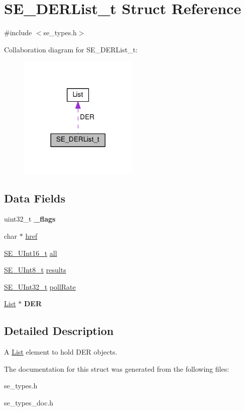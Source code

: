 \hypertarget{structSE__DERList__t}{}\section{S\+E\+\_\+\+D\+E\+R\+List\+\_\+t Struct Reference}
\label{structSE__DERList__t}


{\ttfamily \#include $<$se\+\_\+types.\+h$>$}



Collaboration diagram for S\+E\+\_\+\+D\+E\+R\+List\+\_\+t\+:\nopagebreak
\begin{figure}[H]
\begin{center}
\leavevmode
\includegraphics[width=161pt]{structSE__DERList__t__coll__graph}
\end{center}
\end{figure}
\subsection*{Data Fields}
\begin{DoxyCompactItemize}
\item 
uint32\+\_\+t {\bfseries \+\_\+flags}
\item 
char $\ast$ \hyperlink{group__DERList_gacfb770fdc796c21720ac7a361245ca9e}{href}
\item 
\hyperlink{group__UInt16_gac68d541f189538bfd30cfaa712d20d29}{S\+E\+\_\+\+U\+Int16\+\_\+t} \hyperlink{group__DERList_ga9aaa7fb12c771329499444b27f994150}{all}
\item 
\hyperlink{group__UInt8_gaf7c365a1acfe204e3a67c16ed44572f5}{S\+E\+\_\+\+U\+Int8\+\_\+t} \hyperlink{group__DERList_ga54493ab9c3e5dd91709ef6fa49fdc70a}{results}
\item 
\hyperlink{group__UInt32_ga70bd4ecda3c0c85d20779d685a270cdb}{S\+E\+\_\+\+U\+Int32\+\_\+t} \hyperlink{group__DERList_ga2b2db250d29172061ea81a3f2d88d190}{poll\+Rate}
\item 
\hyperlink{structList}{List} $\ast$ {\bfseries D\+ER}
\end{DoxyCompactItemize}


\subsection{Detailed Description}
A \hyperlink{structList}{List} element to hold D\+ER objects. 

The documentation for this struct was generated from the following files\+:\begin{DoxyCompactItemize}
\item 
se\+\_\+types.\+h\item 
se\+\_\+types\+\_\+doc.\+h\end{DoxyCompactItemize}
